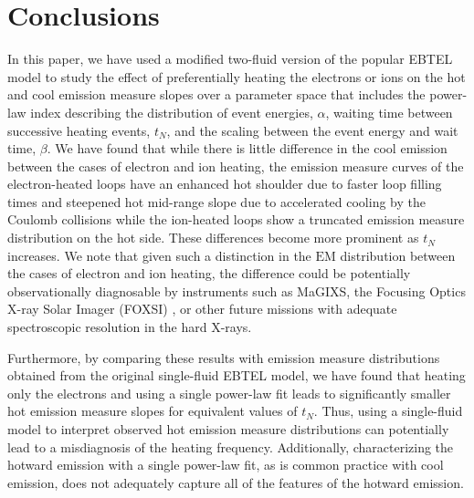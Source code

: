 \documentclass[apj]{emulateapj}
\begin{document}
	\section{Conclusions}
	\label{sec:conclusions}
	\par In this paper, we have used a modified two-fluid version of the popular EBTEL model to study the effect of preferentially heating the electrons or ions on the hot and cool emission measure slopes over a parameter space that includes the power-law index describing the distribution of event energies, $\alpha$, waiting time between successive heating events, $t_N$, and the scaling between the event energy and wait time, $\beta$. We have found that while there is little difference in the cool emission between the cases of electron and ion heating, the emission measure curves of the electron-heated loops have an enhanced hot shoulder due to faster loop filling times and steepened hot mid-range slope due to accelerated cooling by the Coulomb collisions while the ion-heated loops show a truncated emission measure distribution on the hot side. These differences become more prominent as $t_N$ increases. We note that given such a distinction in the $\mathrm{EM}$ distribution between the cases of electron and ion heating, the difference could be potentially observationally diagnosable by instruments such as MaGIXS, the Focusing Optics X-ray Solar Imager (FOXSI) \citep{krucker_focusing_2011}, or other future missions with adequate spectroscopic resolution in the hard X-rays.
	\par Furthermore, by comparing these results with emission measure distributions obtained from the original single-fluid EBTEL model, we have found that heating only the electrons and using a single power-law fit leads to significantly smaller hot emission measure slopes for equivalent values of $t_N$. Thus, using a single-fluid model to interpret observed hot emission measure distributions can potentially lead to a misdiagnosis of the heating frequency. Additionally, characterizing the hotward emission with a single power-law fit, as is common practice with cool emission, does not adequately capture all of the features of the hotward emission.
\end{document}
